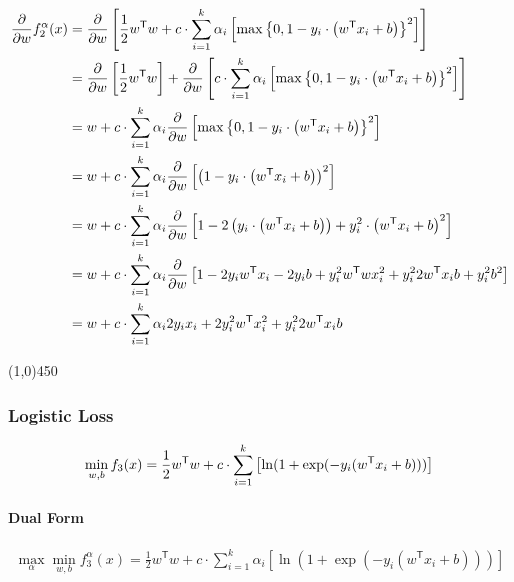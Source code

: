 \documentclass[12pt,landscape]{article}
\newcommand{\hr}{\begin{center} \line(1,0){450} \end{center}}
\newcommand{\tr}{^\mathsf{T}}
\begin{document}
\begin{align}
\frac{\partial}{\partial w} f^{\alpha}_2(x) &= \frac{\partial}{\partial w} \left[  \frac{1}{2} w\tr w +c \cdot \sum\limits_{i=1}^k \alpha_i \left[ \twoLossReg \right] \right]\nonumber\\
&= \frac{\partial}{\partial w} \left[  \frac{1}{2} w\tr w \right] + \frac{\partial}{\partial w} \left[  c \cdot \sum\limits_{i=1}^k \alpha_i \left[\twoLossReg \right] \right]\nonumber\\
&= w +   c \cdot \sum\limits_{i=1}^k \alpha_i \frac{\partial}{\partial w} \left[\twoLossReg \right]\nonumber\\
&= w +   c \cdot \sum\limits_{i=1}^k \alpha_i \frac{\partial}{\partial w} \left[  \left(1-y_i \cdot \left( w\tr x_i + b \right) \right)^2 \right]\nonumber\\
&= w +   c \cdot \sum\limits_{i=1}^k \alpha_i \frac{\partial}{\partial w} \left[ 1 - 2 \left(y_i \cdot \left( w\tr x_i + b \right) \right) + y_i^2 \cdot \left( w\tr x_i + b \right)^2 \right]\nonumber\\
&= w +   c \cdot \sum\limits_{i=1}^k \alpha_i \frac{\partial}{\partial w} \left[ 1 - 2 y_i w\tr x_i - 2 y_i b  + y_i^2 w\tr w x_i^2 + y_i^2 2 w\tr x_i  b + y_i^2 b^2 \right]\nonumber\\
&= w +   c \cdot \sum\limits_{i=1}^k \alpha_i 2 y_i x_i   + 2 y_i^2 w\tr x_i^2 + y_i^2 2 w\tr x_i  b \nonumber\\
\end{align}



\hr
\subsubsection*{Logistic Loss}
\newcommand{\zLog}{1+\exp(-y_i (w\tr x_i + b))}

\begin{equation}
\min\limits_{w,b} f_3(x) = \frac{1}{2} w\tr w +c \cdot \sum\limits_{i=1}^k \left[ \ln(\zLog)\right]\\
\end{equation}

\paragraph{Dual Form}
\begin{align*}
\max\limits_{\alpha} \min\limits_{w,b} f^{\alpha}_3(x) = \frac{1}{2} w\tr w +c \cdot \sum\limits_{i=1}^k \alpha_i \left[ \ln(\zLog)\right]\\
\end{align*}
\end{document}
